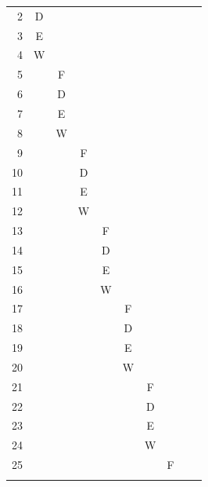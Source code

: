 \begin{table}
{{\begin{tabular}{rccccccccc}
                 2 & D &   &   &   &   &   &   &   &   \\
                 3 & E &   &   &   &   &   &   &   &   \\ \rowcolor[gray]{.975}
                 4 & W &   &   &   &   &   &   &   &   \\
                 5 &   & F &   &   &   &   &   &   &   \\ \rowcolor[gray]{.975}
                 6 &   & D &   &   &   &   &   &   &   \\
                 7 &   & E &   &   &   &   &   &   &   \\ \rowcolor[gray]{.975}
                 8 &   & W &   &   &   &   &   &   &   \\
                 9 &   &   & F &   &   &   &   &   &   \\ \rowcolor[gray]{.975}
                10 &   &   & D &   &   &   &   &   &   \\
                11 &   &   & E &   &   &   &   &   &   \\ \rowcolor[gray]{.975}
                12 &   &   & W &   &   &   &   &   &   \\
                13 &   &   &   & F &   &   &   &   &   \\ \rowcolor[gray]{.975}
                14 &   &   &   & D &   &   &   &   &   \\
                15 &   &   &   & E &   &   &   &   &   \\ \rowcolor[gray]{.975}
                16 &   &   &   & W &   &   &   &   &   \\
                17 &   &   &   &   & F &   &   &   &   \\ \rowcolor[gray]{.975}
                18 &   &   &   &   & D &   &   &   &   \\
                19 &   &   &   &   & E &   &   &   &   \\ \rowcolor[gray]{.975}
                20 &   &   &   &   & W &   &   &   &   \\
                21 &   &   &   &   &   & F &   &   &   \\ \rowcolor[gray]{.975}
                22 &   &   &   &   &   & D &   &   &   \\
                23 &   &   &   &   &   & E &   &   &   \\ \rowcolor[gray]{.975}
                24 &   &   &   &   &   & W &   &   &   \\
                25 &   &   &   &   &   &   & F &   &   \\ \rowcolor[gray]{.975}

\end{tabular}}}
\end{table}
